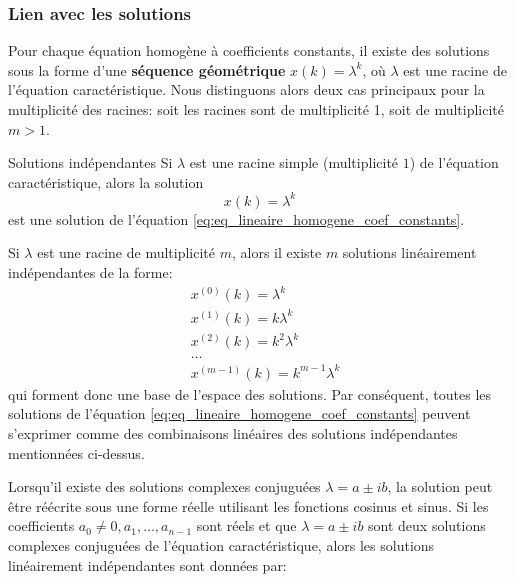             \subsubsection{Lien avec les solutions}
                Pour chaque équation homogène à coefficients constants, il existe des solutions sous la forme d'une \textbf{séquence géométrique} $x(k) = \lambda^k$, où $\lambda$ est une racine de l'équation caractéristique. Nous distinguons alors deux cas principaux pour la multiplicité des racines: soit les racines sont de multiplicité 1, soit de multiplicité $m > 1$.
                \begin{theorem}{Solutions indépendantes}
                    Si $\lambda$ est une racine simple (multiplicité $1$) de l'équation caractéristique, alors la solution
                    \begin{equation}
                        x(k) = \lambda^k
                    \end{equation}
                    est une solution de l'équation \eqref{eq:eq_lineaire_homogene_coef_constants}.
                    
                    Si $\lambda$ est une racine de multiplicité $m$, alors il existe $m$ solutions linéairement indépendantes de la forme:
                    \begin{equation}
                        \begin{split}
                            &x^{(0)}(k) = \lambda^k \\ 
                            &x^{(1)}(k) = k \lambda^k \\ 
                            &x^{(2)}(k) = k^2 \lambda^k \\ 
                            &\dots \\ 
                            &x^{(m-1)}(k) = k^{m-1} \lambda^k
                        \end{split}
                    \end{equation}
                    qui forment donc une base de l'espace des solutions.
                    Par conséquent, toutes les solutions de l'équation \eqref{eq:eq_lineaire_homogene_coef_constants} peuvent s'exprimer comme des combinaisons linéaires des solutions indépendantes mentionnées ci-dessus.
                \end{theorem}
                Lorsqu'il existe des solutions complexes conjuguées $\lambda = a \pm ib$, la solution peut être réécrite sous une forme réelle utilisant les fonctions cosinus et sinus.
                Si les coefficients $a_0 \neq 0, a_1, \dots, a_{n-1}$  sont réels et que $\lambda = a \pm ib$ sont deux solutions complexes conjuguées de l'équation caractéristique, alors les solutions linéairement indépendantes sont données par:
